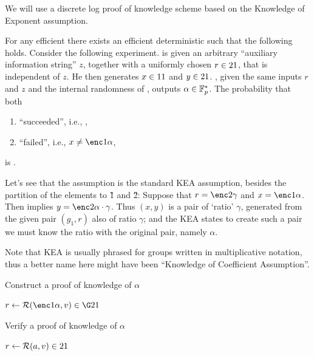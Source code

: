 \documentclass{article}
\begin{document}
We will use a discrete log proof of knowledge scheme based on the Knowledge of Exponent assumption.
\begin{dfn}\label{dfn:koeassumption}
For any efficient \adv there exists an efficient deterministic \ext such that the following holds.
 Consider the following experiment.
\adv is given an arbitrary ``auxiliary information string'' $z$,
together with a uniformly chosen $r\in \G21$, that is independent of $z$.
He then generates $x\in \G11$ and $y\in \G21$.
   \ext, given the same inputs $r$ and $z$ and the internal randomness of \adv, outputs  
$\alpha\in \Fstar$.
The probability that both
 \begin{enumerate}
  \item \adv ``succeeded'', i.e., ,
  \item \ext ``failed'', i.e., $x\neq \enc1{\alpha}$,
   \end{enumerate}
is \negl.
\end{dfn}
\begin{remark}
 Let's see that the assumption is the standard KEA assumption, besides the partition of the elements to \G1 and \G2:
 Suppose that $r=\enc2{\gamma}$ and $x=\enc1{\alpha}$.
 Then  implies $y=\enc2{\alpha\cdot \gamma}$.
 Thus $(x,y)$ is a pair of `ratio' $\gamma$, generated from the given pair $(g_1,r)$ also
 of ratio $\gamma$; and the KEA states to create such a pair we must know the ratio with the original pair, namely $\alpha$.
 
 Note that KEA is usually phrased for groups written in multiplicative notation, thus a better name
 here might have been ``Knowledge of Coefficient Assumption''.
\end{remark}

\begin{algorithm}[H]
\caption{Construct a proof of knowledge of $\alpha$}
\begin{algorithmic}[1]
  \Require{$\alpha \in \Fstar$}
    \State $r\gets \RO(\enc1{\alpha}, v)\in \G21$
    \State
  \EndFunction
\end{algorithmic}
\end{algorithm}

\begin{algorithm}[H]
\caption{Verify a proof of knowledge of $\alpha$}
\begin{algorithmic}[1]
    \State $r\gets \RO(a, v)\in \G21$
    \State
  \EndFunction
\end{algorithmic}
\end{algorithm}
\end{document}

